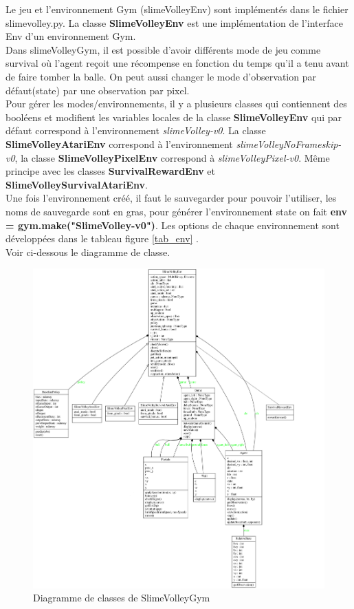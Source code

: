 \documentclass[11pt, a4paper]{article}
\begin{document}
	Le jeu et l'environnement Gym (slimeVolleyEnv) sont implémentés dans le fichier slimevolley.py. La classe \textbf{SlimeVolleyEnv} est une implémentation de l'interface Env d'un environnement Gym. \\
	Dans slimeVolleyGym, il est possible d'avoir différents mode de jeu comme survival où l'agent reçoit une récompense en fonction du temps qu'il a tenu avant de faire tomber la balle. On peut aussi changer le mode d'observation par défaut(state) par une observation par pixel.\\
	Pour gérer les modes/environnements, il y a plusieurs classes qui contiennent des booléens et modifient les variables locales de la classe \textbf{SlimeVolleyEnv} qui par défaut correspond à l'environnement \textit{slimeVolley-v0}. La classe \textbf{SlimeVolleyAtariEnv} correspond à l'environnement \textit{slimeVolleyNoFrameskip-v0}, la classe \textbf{SlimeVolleyPixelEnv} correspond à \textit{slimeVolleyPixel-v0}. Même principe avec les classes \textbf{SurvivalRewardEnv} et \textbf{SlimeVolleySurvivalAtariEnv}.\\
	Une fois l'environnement créé, il faut le sauvegarder pour pouvoir l'utiliser, les noms de sauvegarde sont en gras, pour générer l'environnement state on fait \textbf{ env = gym.make("SlimeVolley-v0")}. Les options de chaque environnement sont développées dans le tableau figure \ref{tab_env} .\\
	Voir ci-dessous le diagramme de classe.

	\begin{figure}[H]
		\centering
		\includegraphics[scale=0.5]{images/classes.png}
		\caption {Diagramme de classes de SlimeVolleyGym}
	\end{figure}
\end{document}
